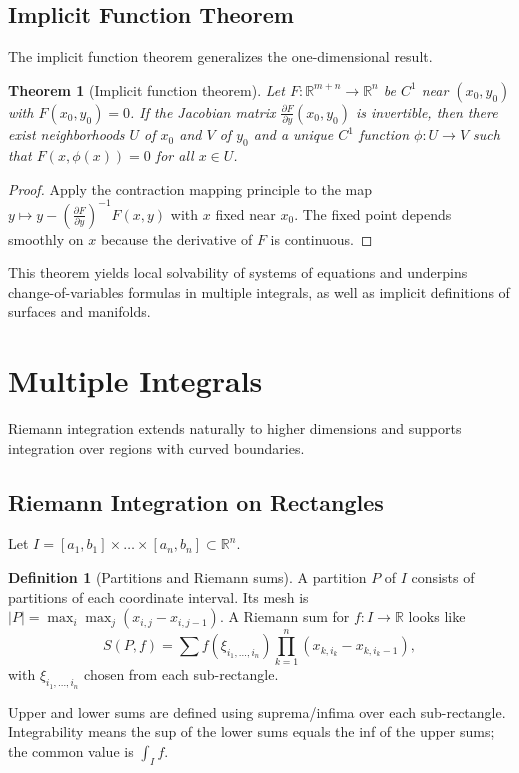 \documentclass{article}
\theoremstyle{definition}
\newtheorem{definition}{Definition}[section]
\theoremstyle{plain}
\newtheorem{theorem}{Theorem}[section]
\begin{document}
\subsection{Implicit Function Theorem}\label{subsec:implicit-function}
The implicit function theorem generalizes the one-dimensional result.
\begin{theorem}[Implicit function theorem]
	Let $F\colon \mathbb{R}^{m+n} \to \mathbb{R}^n$ be $C^1$ near $(x_0,y_0)$ with $F(x_0,y_0)=0$. If the Jacobian matrix $\frac{\partial F}{\partial y}(x_0,y_0)$ is invertible, then there exist neighborhoods $U$ of $x_0$ and $V$ of $y_0$ and a unique $C^1$ function $\phi\colon U\to V$ such that $F(x,\phi(x))=0$ for all $x\in U$.
\end{theorem}
\begin{proof}
	Apply the contraction mapping principle to the map $y \mapsto y - \left(\frac{\partial F}{\partial y}\right)^{-1} F(x,y)$ with $x$ fixed near $x_0$. The fixed point depends smoothly on $x$ because the derivative of $F$ is continuous.
\end{proof}

This theorem yields local solvability of systems of equations and underpins change-of-variables formulas in multiple integrals, as well as implicit definitions of surfaces and manifolds.
		
		
\section{Multiple Integrals}
Riemann integration extends naturally to higher dimensions and supports integration over regions with curved boundaries.

\subsection{Riemann Integration on Rectangles}
Let $I=[a_1,b_1]\times \dots \times [a_n,b_n] \subset \mathbb{R}^n$.
\begin{definition}[Partitions and Riemann sums]
	A partition $P$ of $I$ consists of partitions of each coordinate interval. Its mesh is $|P| = \max_i\max_j (x_{i,j}-x_{i,j-1})$. A Riemann sum for $f\colon I\to \mathbb{R}$ looks like
	\[
		S(P,f)=\sum f(\xi_{i_1,\dots,i_n}) \prod_{k=1}^n (x_{k,i_k} - x_{k,i_k-1}),
	\]
	with $\xi_{i_1,\dots,i_n}$ chosen from each sub-rectangle.
\end{definition}

Upper and lower sums are defined using suprema/infima over each sub-rectangle. Integrability means the sup of the lower sums equals the inf of the upper sums; the common value is $\int_I f$.
\end{document}
